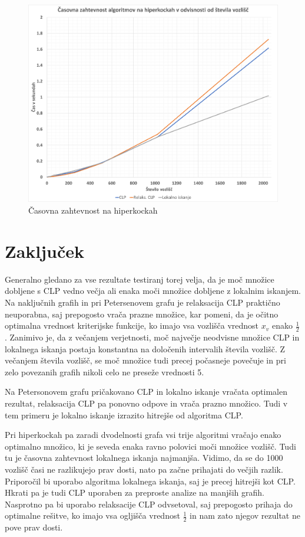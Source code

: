 \documentclass[a4paper, 12 pt]{article}
\theoremstyle{definition}
\theoremstyle{plain}
\theoremstyle{remark}
\begin{document}
\begin{figure}[H]
\centering
  \includegraphics[scale=0.30]{Casovna_zahtevnost_hiperkocke.png}
  \caption{Časovna zahtevnost na hiperkockah}
\end{figure}

\section{Zaključek}
Generalno gledano za vse rezultate testiranj torej velja, da je moč množice dobljene s CLP vedno večja ali enaka moči množice dobljene z lokalnim iskanjem. Na naključnih grafih in pri Petersenovem grafu je relaksacija CLP praktično neuporabna, saj prepogosto vrača prazne množice, kar pomeni, da je očitno optimalna vrednost kriterijske funkcije, ko imajo vsa vozlišča vrednost $x_v$ enako $\frac{1}{2}$. Zanimivo je, da z večanjem verjetnosti, moč največje neodvisne množice CLP in lokalnega iskanja postaja konstantna na določenih intervalih števila vozlišč. Z večanjem števila vozlišč, se moč množice tudi precej počasneje povečuje in pri zelo povezanih grafih nikoli celo ne preseže vrednosti 5.

Na Petersonovem grafu pričakovano CLP in lokalno iskanje vračata optimalen rezultat, relaksacija CLP pa ponovno odpove in vrača prazno množico. Tudi v tem primeru je lokalno iskanje izrazito hitrejše od algoritma CLP.

Pri hiperkockah pa zaradi dvodelnosti grafa vsi trije algoritmi vračajo enako optimalno množico, ki je seveda enaka ravno polovici moči množice vozlišč. Tudi tu je časovna zahtevnost lokalnega iskanja najmanjša. Vidimo, da se do 1000 vozlišč časi ne razlikujejo prav dosti, nato pa začne prihajati do večjih razlik.\\

Priporočil bi uporabo algoritma lokalnega iskanja, saj je precej hitrejši kot CLP. Hkrati pa je tudi CLP uporaben za preproste analize na manjših grafih. Nasprotno pa bi uporabo relaksacije CLP odvsetoval, saj prepogosto prihaja do optimalne rešitve, ko imajo vsa ogljišča vrednost $\frac{1}{2}$ in nam zato njegov rezultat ne pove prav dosti.


\end{document}
